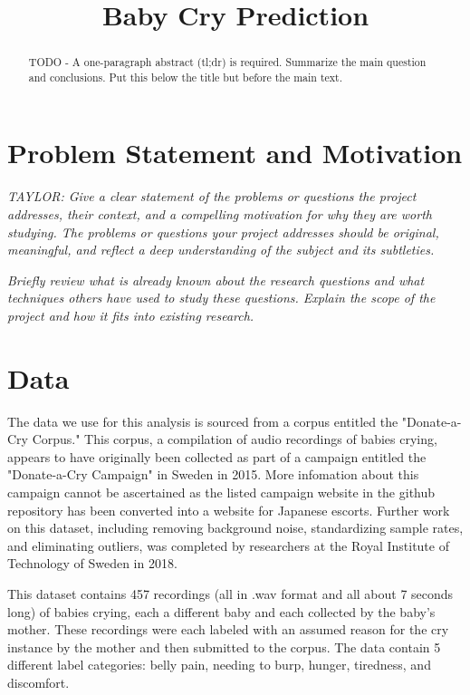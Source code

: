 \documentclass[10pt,letterpaper]{article}
\title{Baby Cry Prediction}
\begin{document}
\maketitle
\begin{abstract}
   TODO - A one-paragraph abstract (tl;dr) is required. Summarize the main question and conclusions. Put this below the title but before the main text.
\end{abstract}

\section{Problem Statement and Motivation}
\textit{TAYLOR: Give a clear statement of the problems or questions the project addresses, their context, and a compelling motivation for why they are worth studying. The problems or questions your project addresses should be original, meaningful, and reflect a deep understanding of the subject and its subtleties.}

\textit{Briefly review what is already known about the research questions and what techniques others have used to study these questions. Explain the scope of the project and how it fits into existing research.}


\section{Data}
The data we use for this analysis is sourced from a corpus entitled
the "Donate-a-Cry Corpus."
This corpus, a compilation of audio recordings of babies crying, appears to have originally been collected as part of a campaign entitled the "Donate-a-Cry Campaign" in Sweden in 2015.
More infomation about this campaign cannot be ascertained as the listed campaign website in the github repository has been converted into a website for Japanese escorts.
Further work on this dataset, including removing background noise, standardizing sample rates, and eliminating outliers, was completed by researchers at the Royal Institute of Technology of Sweden in 2018.

This dataset contains 457 recordings (all in .wav format and all about 7 seconds long) of babies crying, each a different baby and each collected by the baby's mother.
These recordings were each labeled with an assumed reason for the cry instance by the mother and then submitted to the corpus.
The data contain 5 different label categories: belly pain, needing to burp, hunger, tiredness, and discomfort.
\end{document}
